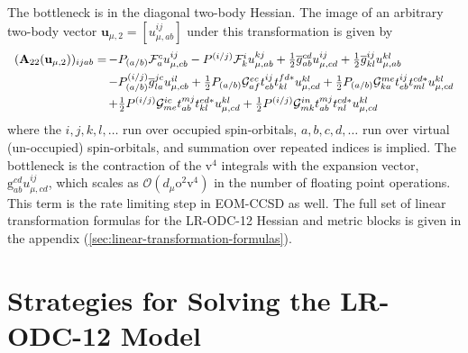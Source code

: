 The bottleneck is in the diagonal two-body Hessian.
The image of an arbitrary two-body vector
\(
    \mathbf{u}_{\mu,2}
    =
    [u_{\mu,ab}^{ij}]
\)
under this transformation is given by
\begin{equation}
    \label{eq:two-body-hessian-function-in-text}
    \begin{array}{r@{\,}l}
        (\mathbf{A}_{22}(\mathbf{u}_{\mu,2}))_{ijab}
        =
        &
        -
        P_{(a/b)}
        \mathcal{F}_a^c
        u_{\mu,cb}^{ij}
        -
        P^{(i/j)}
        \mathcal{F}_k^i
        u_{\mu,ab}^{kj}
        +
        \tfrac{1}{2}
        \overline{g}_{ab}^{cd}
        u_{\mu,cd}^{ij}
        +
        \tfrac{1}{2}
        \overline{g}_{kl}^{ij}
        u_{\mu,ab}^{kl}
        \\[5pt]
        &
        -
        P_{(a/b)}^{(i/j)}
        \overline{g}_{la}^{jc}
        u_{\mu,cb}^{il}
        +
        \tfrac{1}{2}
        P_{(a/b)}
        \mathcal{G}_{af}^{ec}
        t_{eb}^{ij}
        t_{kl}^{fd*}
        u_{\mu,cd}^{kl}
        +
        \tfrac{1}{2}
        P_{(a/b)}
        \mathcal{G}_{ka}^{me}
        t_{eb}^{ij}
        t_{ml}^{cd*}
        u_{\mu,cd}^{kl}
        \\[5pt]
        &
        +
        \tfrac{1}{2}
        P^{(i/j)}
        \mathcal{G}_{me}^{ic}
        t_{ab}^{mj}
        t_{kl}^{ed*}
        u_{\mu,cd}^{kl}
        +
        \tfrac{1}{2}
        P^{(i/j)}
        \mathcal{G}_{mk}^{in}
        t_{ab}^{mj}
        t_{nl}^{cd*}
        u_{\mu,cd}^{kl}
    \end{array}
\end{equation}
where the \(i,j,k,l,\ldots\) run over occupied spin-orbitals, \(a,b,c,d,\ldots\)
run over virtual (un-occupied) spin-orbitals, and summation over repeated
indices is implied.
The bottleneck is the contraction of the \(\mathrm{v}^4\) integrals with the
expansion vector, \(\mathrm{g}_{ab}^{cd}u_{\mu,cd}^{ij}\), which scales as
\(\mathcal{O}(d_\mu\mathrm{o}^2\mathrm{v}^4)\) in the number of floating point
operations.
This term is the rate limiting step in EOM-CCSD as well.
The full set of linear transformation formulas for the LR-ODC-12 Hessian and
metric blocks is given in the appendix
(\cref{sec:linear-transformation-formulas}).


\section{Strategies for Solving the LR-ODC-12 Model}
\label{sec:davidson:strategies}

